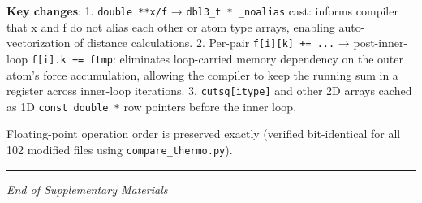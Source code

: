 \documentclass[
  11pt,
]{article}
\begin{document}
\textbf{Key changes}: 1. \texttt{double\ **x/f} →
\texttt{dbl3\_t\ *\ \_noalias} cast: informs compiler that x and f do
not alias each other or atom type arrays, enabling auto-vectorization of
distance calculations. 2. Per-pair \texttt{f{[}i{]}{[}k{]}\ +=\ ...} →
post-inner-loop \texttt{f{[}i{]}.k\ +=\ ftmp}: eliminates loop-carried
memory dependency on the outer atom's force accumulation, allowing the
compiler to keep the running sum in a register across inner-loop
iterations. 3. \texttt{cutsq{[}itype{]}} and other 2D arrays cached as
1D \texttt{const\ double\ *} row pointers before the inner loop.

Floating-point operation order is preserved exactly (verified
bit-identical for all 102 modified files using
\texttt{compare\_thermo.py}).

\begin{center}\rule{0.5\linewidth}{0.5pt}\end{center}

\emph{End of Supplementary Materials}
\end{document}
